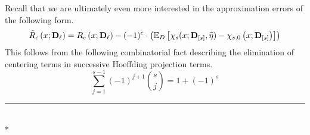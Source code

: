 Recall that we are ultimately even more interested in the approximation errors of the following form.
\begin{equation}
    \tilde{R}_{c}\left(x; \mathbf{D}_{\ell}\right)
     = R_{c}\left(x; \mathbf{D}_{\ell}\right) - (-1)^{c} \cdot \left(\mathbb{E}_{D}\left[\chi_{s}(x; \mathbf{D}_{[s]}, \widehat{\eta}) - \chi_{s,0}\left(x; \mathbf{D}_{[s]}\right)\right]\right)
\end{equation}
This follows from the following combinatorial fact describing the elimination of centering terms in successive Hoeffding projection terms.
\begin{equation}
    \sum_{j = 1}^{s-1}(-1)^{j+1} \binom{s}{j} = 1 + (-1)^{s}
\end{equation}

\hrule

\begin{lem}\label{lem:ps_hajek_error}\mbox{}\\*
    
\end{lem}

